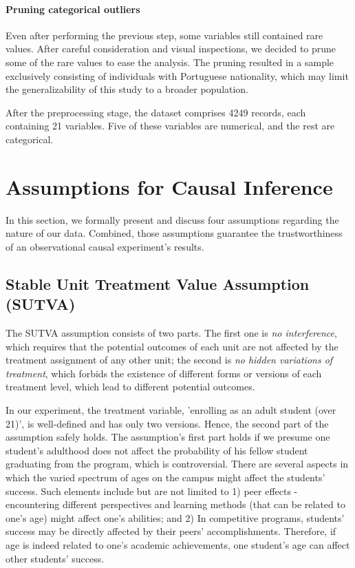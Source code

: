 \documentclass{article}
\begin{document}
\paragraph{Pruning categorical outliers} Even after performing the previous step, some variables still contained rare values. After careful consideration and visual inspections, we decided to prune some of the rare values to ease the analysis. The pruning resulted in a sample exclusively consisting of individuals with Portuguese nationality, which may limit the generalizability of this study to a broader population. 

After the preprocessing stage, the dataset comprises 4249 records, each containing 21 variables. Five of these variables are numerical, and the rest are categorical.


\section{Assumptions for Causal Inference}\label{sec:assumptions}

In this section, we formally present and discuss four assumptions regarding the nature of our data. Combined, those assumptions guarantee the trustworthiness of an observational causal experiment's results.

\subsection{Stable Unit Treatment Value Assumption (SUTVA)}

The SUTVA assumption consists of two parts. The first one is \emph{no interference}, which requires that the potential outcomes of each unit are not affected by the treatment assignment of any other unit; the second is \emph{no hidden variations of treatment}, which forbids the existence of different forms or versions of each treatment level, which lead to different potential outcomes.

In our experiment, the treatment variable, 'enrolling as an adult student (over 21)', is well-defined and has only two versions. Hence, the second part of the assumption safely holds. The assumption's first part holds if we presume one student's adulthood does not affect the probability of his fellow student graduating from the program, which is controversial. There are several aspects in which the varied spectrum of ages on the campus might affect the students' success. Such elements include but are not limited to 1) peer effects - encountering different perspectives and learning methods (that can be related to one's age) might affect one's abilities; and 2) In competitive programs, students' success may be directly affected by their peers' accomplishments. Therefore, if age is indeed related to one's academic achievements, one student's age can affect other students' success.
\end{document}
